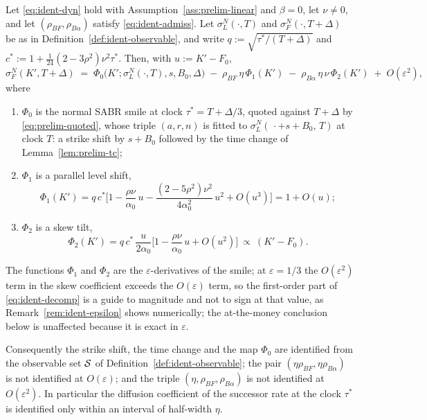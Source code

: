 \documentclass[../../../main.tex]{subfiles}
\begin{document}
\begin{theorem}\label{thm:ident}
Let \eqref{eq:ident-dyn} hold with Assumption~\ref{ass:prelim-linear} and $\beta=0$, let $\nu\neq0$, and let $(\rho_{BF},\rho_{B\alpha})$ satisfy \eqref{eq:ident-admiss}. Let $\sigma^N_L(\cdot,T)$ and $\sigma^N_F(\cdot,T+\Delta)$ be as in Definition~\ref{def:ident-observable}, and write $q:=\sqrt{\tau^*/(T+\Delta)}$ and $c^*:=1+\tfrac1{24}(2-3\rho^2)\nu^2\tau^*$. Then, with $u:=K'-F_0$,
\begin{equation}\label{eq:ident-decomp}
\sigma^N_F(K',T+\Delta)\;=\;\Phi_0\big(K';\sigma^N_L(\cdot,T),s,B_0,\Delta\big)\;-\;\rho_{BF}\,\eta\,\Phi_1(K')\;-\;\rho_{B\alpha}\,\eta\,\nu\,\Phi_2(K')\;+\;O(\varepsilon^2),
\end{equation}
where
\begin{enumerate}[nosep,label=(\roman*)]
\item $\Phi_0$ is the normal SABR smile at clock $\tau^*=T+\Delta/3$, quoted against $T+\Delta$ by \eqref{eq:prelim-quoted}, whose triple $(a,r,n)$ is fitted to $\sigma^N_L(\,\cdot+s+B_0,\,T)$ at clock $T$: a strike shift by $s+B_0$ followed by the time change of Lemma~\ref{lem:prelim-tc};
\item $\Phi_1$ is a parallel level shift,
\begin{equation}\label{eq:ident-phi1}
\Phi_1(K')=q\,c^*\Big[1-\frac{\rho\nu}{\alpha_0}\,u-\frac{(2-5\rho^2)\nu^2}{4\alpha_0^2}\,u^2+O(u^3)\Big]=1+O(u);
\end{equation}
\item $\Phi_2$ is a skew tilt,
\begin{equation}\label{eq:ident-phi2}
\Phi_2(K')=q\,c^*\,\frac{u}{2\alpha_0}\Big[1-\frac{\rho\nu}{\alpha_0}\,u+O(u^2)\Big]\ \propto\ (K'-F_0).
\end{equation}
\end{enumerate}
The functions $\Phi_1$ and $\Phi_2$ are the $\varepsilon$-derivatives of the smile; at $\varepsilon=1/3$ the $O(\varepsilon^2)$ term in the skew coefficient exceeds the $O(\varepsilon)$ term, so the first-order part of \eqref{eq:ident-decomp} is a guide to magnitude and not to sign at that value, as Remark~\ref{rem:ident-epsilon} shows numerically; the at-the-money conclusion below is unaffected because it is exact in $\varepsilon$.

Consequently the strike shift, the time change and the map $\Phi_0$ are identified from the observable set $\mathcal S$ of Definition~\ref{def:ident-observable}; the pair $(\eta\rho_{BF},\eta\rho_{B\alpha})$ is not identified at $O(\varepsilon)$; and the triple $(\eta,\rho_{BF},\rho_{B\alpha})$ is not identified at $O(\varepsilon^2)$. In particular the diffusion coefficient of the successor rate at the clock $\tau^*$ is identified only within an interval of half-width $\eta$.
\end{theorem}
\end{document}
